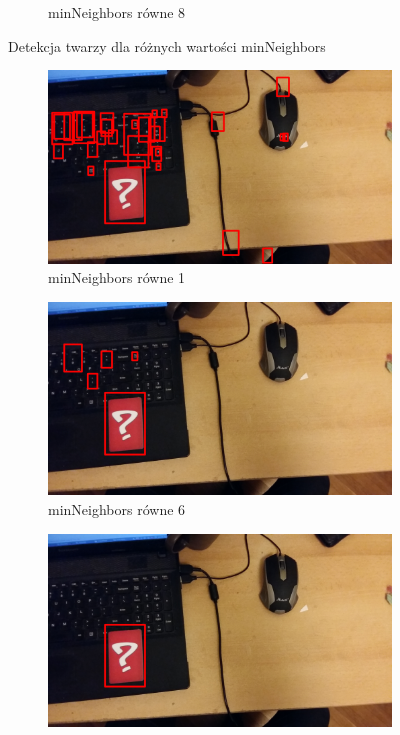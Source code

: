 \begin{figure}[H]
\begin{subfigure}{0.32\textwidth}
        \caption{minNeighbors równe 8}
        \label{fig:somsiadTwarze8}
    \end{subfigure}
    \caption{Detekcja twarzy dla różnych wartości minNeighbors}
    \label{twarzeeSomsiady}
\end{figure}

\begin{figure}[H]
    \centering
        \begin{subfigure}{0.32\textwidth}
        \centering
        \includegraphics[width=\linewidth]{imgs/somsiadd1.jpg}
        \caption{minNeighbors równe 1}
        \label{fig:somsiadKarta1}
    \end{subfigure}\hfill
    \begin{subfigure}{0.32\textwidth}
        \centering
        \includegraphics[width=\linewidth]{imgs/somsiadd6.jpg}
        \caption{minNeighbors równe 6}
        \label{fig:somsiadKarta6}
    \end{subfigure}\hfill
    \begin{subfigure}{0.32\textwidth}
        \centering
        \includegraphics[width=\linewidth]{imgs/somsiadd16.jpg}

\end{subfigure}
\end{figure}
